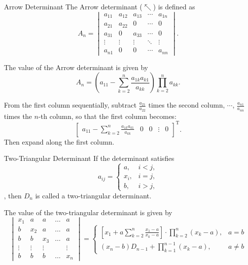 \documentclass[11pt]{../../TexTemplate/elegantbook} %
\begin{document}
\begin{definition}{Arrow Determinant}
    The Arrow determinant (\(\nwarrow\)) is defined as
    \[
    A_n = \begin{vmatrix}
    a_{11} & a_{12} & a_{13} & \cdots & a_{1n} \\
    a_{21} & a_{22} & 0 & \cdots & 0 \\
    a_{31} & 0 & a_{33} & \cdots & 0 \\
    \vdots & \vdots & \vdots & \ddots & \vdots \\
    a_{n1} & 0 & 0 & \cdots & a_{nn}
    \end{vmatrix}.
    \]

    The value of the Arrow determinant is given by
    \[
    A_n = \left( a_{11}- \sum_{k=2}^{n} \frac{a_{1k}a_{k1}}{a_{kk}}  \right)\prod_{k=2}^{n} a_{kk}.
    \]
\end{definition}

From the first column sequentially, subtract \( \frac{a_{21}}{a_{22}} \) times the second column, \(\cdots\), 
\( \frac{a_{n1}}{a_{nn}} \) times the \( n \)-th column, so that the first column becomes:
\[
\begin{bmatrix}
a_{11} - \sum\limits_{k=2}^n \frac{a_{1k}a_{k1}}{a_{kk}} &
0 &
0 &
\vdots &
0
\end{bmatrix}^{\mathrm{T}}.
\]
Then expand along the first column.

\begin{definition}{Two-Triangular Determinant}
    If the determinant satisfies 
    \[ 
    a_{ij} = \begin{cases} 
    a, & i < j, \\ 
    x_{i}, & i = j, \\ 
    b, & i > j,
    \end{cases} 
    \], 
    then \( D_{n} \) is called a two-triangular determinant.
\end{definition}

The value of the two-triangular determinant is given by
\[
\begin{vmatrix}
x_{1} & a & a & \dots & a \\
b & x_{2} & a & \dots & a \\
b & b & x_{3} & \dots & a \\
\vdots & \vdots & \vdots & & \vdots \\
b & b & b & \dots & x_{n}
\end{vmatrix}
=
\begin{cases}
\left[ x_{1} + a \sum\limits^{n}_{k=2} \frac{x_{1}-a}{x_{k}-a} \right] \cdot \prod\limits^{n}_{k=2} (x_{k}-a), & a = b \\
(x_{n}-b) D_{n-1} + \prod\limits^{n-1}_{k=1} (x_{k}-a), & a \neq b 
\end{cases}
\]
\end{document}
